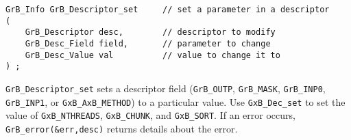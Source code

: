 \documentclass[12pt]{article}
\begin{document}
\begin{mdframed}[userdefinedwidth=6in]
{\footnotesize
\begin{verbatim}
GrB_Info GrB_Descriptor_set     // set a parameter in a descriptor
(
    GrB_Descriptor desc,        // descriptor to modify
    GrB_Desc_Field field,       // parameter to change
    GrB_Desc_Value val          // value to change it to
) ;
\end{verbatim} } \end{mdframed}

\verb'GrB_Descriptor_set' sets a descriptor field (\verb'GrB_OUTP',
\verb'GrB_MASK', \verb'GrB_INP0', \verb'GrB_INP1', or \verb'GxB_AxB_METHOD') to
a particular value.  Use \verb'GxB_Dec_set' to set the value of
\verb'GxB_NTHREADS', \verb'GxB_CHUNK', and \verb'GxB_SORT'.
If an error occurs, \verb'GrB_error(&err,desc)' returns details about the error.
\end{document}
